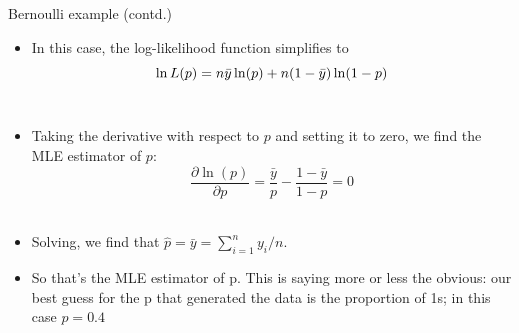 \documentclass[notes,10pt, aspectratio=169]{beamer}
\begin{document}
\begin{frame}{Bernoulli example (contd.)}
  \begin{itemize}
    \item In this case, the log-likelihood function simplifies to
    \[ \ln L(p) = n \Bar{y} \ln(p) + n (1 - \Bar{y}) \ln(1 - p) \]\\[1em]
    \item Taking the derivative with respect to $p$ and setting it to zero, we find the MLE estimator of $p$:
    \[ \frac{\partial \ln(p)}{\partial p} = \frac{\bar{y}}{p} - \frac{1 - \bar{y}}{1 - p} = 0 \]\\[1em]
    \item Solving, we find that $\hat{p} = \bar{y} = \sum_{i=1}^{n} y_i / n$.\\[1em]
    \item So that’s the MLE estimator of p. This is saying more or less the obvious: our best guess for the p that generated the data is the proportion of 1s; in this case $p = 0.4$
  \end{itemize}
\end{frame}




\end{document}
